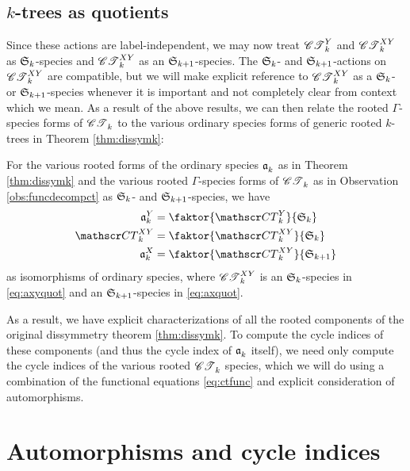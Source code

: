 \documentclass[distribution,draft]{brandiss} %
\numberwithin{section}{chapter}
\numberwithin{figure}{chapter}
\begin{document}
\subsection{$k$-trees as quotients}\label{ss:ktquot}
Since these actions are label-independent, we may now treat $\mathscr{CT}_{k}^{Y}$ and $\mathscr{CT}_{k}^{XY}$ as $ \mathfrak{S}_{k} $-species and $\mathscr{CT}_{k}^{XY}$ as an $ \mathfrak{S}_{k+1} $-species.
The $ \mathfrak{S}_{k} $- and $ \mathfrak{S}_{k+1} $-actions on $\mathscr{CT}_{k}^{XY}$ are compatible, but we will make explicit reference to $\mathscr{CT}_{k}^{XY}$ as a $ \mathfrak{S}_{k} $- or $ \mathfrak{S}_{k+1} $-species whenever it is important and not completely clear from context which we mean.
As a result of the above results, we can then relate the rooted $\Gamma$-species forms of $\mathscr{CT}_{k}^{}$ to the various ordinary species forms of generic rooted $k$-trees in Theorem \ref{thm:dissymk}:
\begin{theorem}
  \label{thm:arootquot}
  For the various rooted forms of the ordinary species $\mathfrak{a}_{k}^{}$ as in Theorem \ref{thm:dissymk} and the various rooted $\Gamma$-species forms of $\mathscr{CT}_{k}^{}$ as in Observation \ref{obs:funcdecompct} as $ \mathfrak{S}_{k} $- and $ \mathfrak{S}_{k+1} $-species, we have
  \begin{subequations}
    \label{eq:arootquot}
    \begin{align}
      \kty{k} &= \faktor{\cty{k}}{\symgp{k}} \label{eq:ayquot} \\
      \ctxy{k} &= \faktor{\ctxy{k}}{\symgp{k}} \label{eq:axyquot} \\
      \ktx{k} &= \faktor{\ctxy{k}}{\symgp{k+1}} \label{eq:axquot}
    \end{align}
  \end{subequations}
  as isomorphisms of ordinary species, where $\mathscr{CT}_{k}^{XY}$ is an $ \mathfrak{S}_{k} $-species in \eqref{eq:axyquot} and an $ \mathfrak{S}_{k+1} $-species in \eqref{eq:axquot}.
\end{theorem}

As a result, we have explicit characterizations of all the rooted components of the original dissymmetry theorem \ref{thm:dissymk}.
To compute the cycle indices of these components (and thus the cycle index of $\mathfrak{a}_{k}^{}$ itself), we need only compute the cycle indices of the various rooted $\mathscr{CT}_{k}^{}$ species, which we will do using a combination of the functional equations \eqref{eq:ctfunc} and explicit consideration of automorphisms.

\section{Automorphisms and cycle indices}\label{s:ktcycind}
\end{document}
